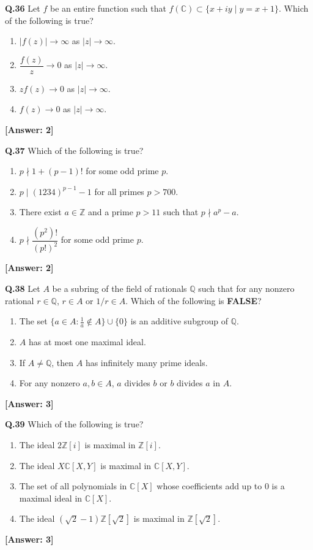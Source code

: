 \documentclass[12pt,a4paper]{article}
\newcommand{\ans}[1]{\quad\textcolor{anscolor}{\textbf{[Answer: #1]}}}
\begin{document}
\textbf{Q.36} Let $f$ be an entire function such that $f(\mathbb{C})\subset\{x+iy\mid y=x+1\}$. Which of the following is true?
\begin{enumerate}[label=\arabic*.]
\item $|f(z)|\to\infty$ as $|z|\to\infty$. \item $\dfrac{f(z)}{z}\to0$ as $|z|\to\infty$.
\item $zf(z)\to0$ as $|z|\to\infty$. \item $f(z)\to0$ as $|z|\to\infty$.
\end{enumerate}\ans{2}

\textbf{Q.37} Which of the following is true?
\begin{enumerate}[label=\arabic*.]
\item $p\nmid1+(p-1)!$ for some odd prime $p$.
\item $p\mid(1234)^{p-1}-1$ for all primes $p>700$.
\item There exist $a\in\mathbb{Z}$ and a prime $p>11$ such that $p\nmid a^p-a$.
\item $p\nmid\dfrac{(p^2)!}{(p!)^2}$ for some odd prime $p$.
\end{enumerate}\ans{2}

\textbf{Q.38} Let $A$ be a subring of the field of rationals $\mathbb{Q}$ such that for any nonzero rational $r\in\mathbb{Q}$, $r\in A$ or $1/r\in A$. Which of the following is \textbf{FALSE}?
\begin{enumerate}[label=\arabic*.]
\item The set $\bigl\{a\in A:\tfrac{1}{a}\notin A\bigr\}\cup\{0\}$ is an additive subgroup of $\mathbb{Q}$.
\item $A$ has at most one maximal ideal.
\item If $A\neq\mathbb{Q}$, then $A$ has infinitely many prime ideals.
\item For any nonzero $a,b\in A$, $a$ divides $b$ or $b$ divides $a$ in $A$.
\end{enumerate}\ans{3}

\textbf{Q.39} Which of the following is true?
\begin{enumerate}[label=\arabic*.]
\item The ideal $2\mathbb{Z}[i]$ is maximal in $\mathbb{Z}[i]$.
\item The ideal $X\mathbb{C}[X,Y]$ is maximal in $\mathbb{C}[X,Y]$.
\item The set of all polynomials in $\mathbb{C}[X]$ whose coefficients add up to 0 is a maximal ideal in $\mathbb{C}[X]$.
\item The ideal $(\sqrt{2}-1)\mathbb{Z}[\sqrt{2}]$ is maximal in $\mathbb{Z}[\sqrt{2}]$.
\end{enumerate}\ans{3}
\end{document}
